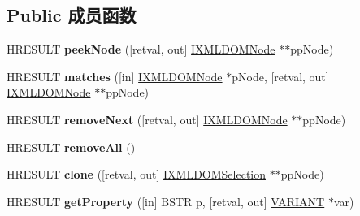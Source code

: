 \subsection*{Public 成员函数}
\begin{DoxyCompactItemize}
\item 
\mbox{\label{interface_m_s_x_m_l2_1_1_i_x_m_l_d_o_m_selection_a34b62a6ec40dabf375bc3401d03e43f7}} 
H\+R\+E\+S\+U\+LT {\bfseries peek\+Node} (\mbox{[}retval, out\mbox{]} \hyperlink{interface_m_s_x_m_l2_1_1_i_x_m_l_d_o_m_node}{I\+X\+M\+L\+D\+O\+M\+Node} $\ast$$\ast$pp\+Node)
\item 
\mbox{\label{interface_m_s_x_m_l2_1_1_i_x_m_l_d_o_m_selection_a81f5c542ba8d45e5fe859518e1a69466}} 
H\+R\+E\+S\+U\+LT {\bfseries matches} (\mbox{[}in\mbox{]} \hyperlink{interface_m_s_x_m_l2_1_1_i_x_m_l_d_o_m_node}{I\+X\+M\+L\+D\+O\+M\+Node} $\ast$p\+Node, \mbox{[}retval, out\mbox{]} \hyperlink{interface_m_s_x_m_l2_1_1_i_x_m_l_d_o_m_node}{I\+X\+M\+L\+D\+O\+M\+Node} $\ast$$\ast$pp\+Node)
\item 
\mbox{\label{interface_m_s_x_m_l2_1_1_i_x_m_l_d_o_m_selection_a1a8b9e181cd4f853cad4f2ee8f4c71c1}} 
H\+R\+E\+S\+U\+LT {\bfseries remove\+Next} (\mbox{[}retval, out\mbox{]} \hyperlink{interface_m_s_x_m_l2_1_1_i_x_m_l_d_o_m_node}{I\+X\+M\+L\+D\+O\+M\+Node} $\ast$$\ast$pp\+Node)
\item 
\mbox{\label{interface_m_s_x_m_l2_1_1_i_x_m_l_d_o_m_selection_aee6b923303a253243027671ffbba2bdd}} 
H\+R\+E\+S\+U\+LT {\bfseries remove\+All} ()
\item 
\mbox{\label{interface_m_s_x_m_l2_1_1_i_x_m_l_d_o_m_selection_aa594da55468deb3f4a8f32ced74fce2a}} 
H\+R\+E\+S\+U\+LT {\bfseries clone} (\mbox{[}retval, out\mbox{]} \hyperlink{interface_m_s_x_m_l2_1_1_i_x_m_l_d_o_m_selection}{I\+X\+M\+L\+D\+O\+M\+Selection} $\ast$$\ast$pp\+Node)
\item 
\mbox{\label{interface_m_s_x_m_l2_1_1_i_x_m_l_d_o_m_selection_a9a29e9a14b39c4a148115f92c6c2731d}} 
H\+R\+E\+S\+U\+LT {\bfseries get\+Property} (\mbox{[}in\mbox{]} B\+S\+TR p, \mbox{[}retval, out\mbox{]} \hyperlink{structtag_v_a_r_i_a_n_t}{V\+A\+R\+I\+A\+NT} $\ast$var)

\end{DoxyCompactItemize}
